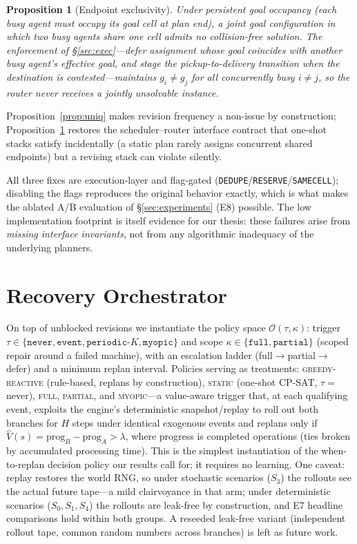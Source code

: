 \documentclass[twocolumn]{article}
\newtheorem{proposition}{Proposition}
\begin{document}
\begin{proposition}[Endpoint exclusivity]\label{prop:endp}
Under persistent goal occupancy (each busy agent must occupy its goal
cell at plan end), a joint goal configuration in which two busy agents
share one cell admits no collision-free solution. The enforcement of
\S\ref{sec:exec}---defer assignment whose goal coincides with another
busy agent's effective goal, and stage the pickup-to-delivery transition
when the destination is contested---maintains $g_i\ne g_j$ for all
concurrently busy $i\ne j$, so the router never receives a jointly
unsolvable instance.
\end{proposition}

Proposition~\ref{prop:uniq} makes revision frequency a
non-issue by construction; Proposition~\ref{prop:endp} restores the
scheduler--router interface contract that one-shot stacks satisfy
incidentally (a static plan rarely assigns concurrent shared endpoints)
but a revising stack can violate silently.

All three fixes are execution-layer and flag-gated
(\texttt{DEDUPE}/\texttt{RESERVE}/\texttt{SAMECELL}); disabling the
flags reproduces the original behavior exactly, which is what makes the
ablated A/B evaluation of \S\ref{sec:experiments} (E8) possible. The
low implementation footprint is itself evidence for our thesis: these
failures arise from \emph{missing interface invariants}, not from any
algorithmic inadequacy of the underlying planners.

\section{Recovery Orchestrator}
On top of unblocked revisions we instantiate the policy space
$\mathcal{O}(\tau,\kappa)$: trigger
$\tau\in\{\texttt{never},\texttt{event},\texttt{periodic-}K,
\texttt{myopic}\}$ and scope
$\kappa\in\{\texttt{full},\texttt{partial}\}$ (scoped repair around a
failed machine), with an escalation ladder (full$\to$partial$\to$defer)
and a minimum replan interval. Policies serving as treatments:
\textsc{greedy-reactive} (rule-based, replans by construction),
\textsc{static} (one-shot CP-SAT, $\tau{=}$never), \textsc{full},
\textsc{partial}, and \textsc{myopic}---a value-aware trigger that, at
each qualifying event, exploits the engine's deterministic
snapshot/replay to roll out both branches for $H$ steps under identical
exogenous events and replans only if
$\hat V(s)=\mathrm{prog}_B-\mathrm{prog}_A>\lambda$, where progress is
completed operations (ties broken by accumulated processing time). This
is the simplest instantiation of the when-to-replan decision policy our
results call for; it requires no learning. One caveat: replay restores
the world RNG, so under stochastic scenarios ($S_3$) the rollouts see
the actual future tape---a mild clairvoyance in that arm; under
deterministic scenarios ($S_0,S_1,S_4$) the rollouts are leak-free by
construction, and E7 headline comparisons hold within both groups. A
reseeded leak-free variant (independent rollout tape, common random
numbers across branches) is left as future work.
\end{document}
